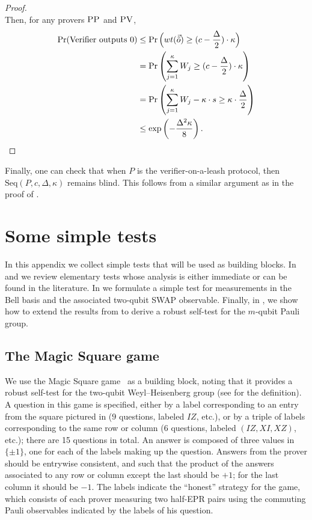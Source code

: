 \documentclass{toc}
\newcommand{\pv}{\textsc{PV}}
\newcommand{\pp}{\textsc{PP}}
\begin{document}
\begin{proof}
\begin{equation*}
\end{equation*}
Then, for any provers $\pp$ and $\pv$,
\begin{align*}
\Pr(\mbox{Verifier outputs $0$}) &\leq \Pr \Big(wt(\vec{\tilde{o}}) \geq (c - \frac{\Delta}{2})\cdot \kappa \Big) \\
&= \Pr \left(\sum_{j=1}^\kappa W_j \geq (c - \frac{\Delta}{2})\cdot \kappa \right) \\
&= \Pr \left(\sum_{j=1}^{\kappa} W_j - \kappa \cdot s \geq \kappa \cdot \frac{\Delta}{2} \right) \\
&\leq \exp \left(-\frac{\Delta^2\kappa}{8}\right). \qedhere
\end{align*}
\end{proof}
 Finally, one can check that when $P$ is the verifier-on-a-leash protocol, then $\mbox{Seq}(P,c,\Delta, \kappa)$ remains blind. This follows from a similar argument as in the proof of .
 
 
 
 
 
\appendix
\appendix




\section{Some simple tests}
\label{sec:clifford-test}


In this appendix we collect simple tests that will be used as building blocks. In  and  we review elementary tests whose analysis is either immediate or can be found in the literature. In  we formulate a simple test for measurements in the Bell basis and the associated two-qubit SWAP observable. 
Finally, in , we show how to extend the results from \cite{natarajan2016robust} to derive a robust self-test for the $m$-qubit Pauli group. 


\subsection{The Magic Square game}
\label{sec:ms}

We use the Magic Square game~\cite{Mermin90} as a building block, noting that it  provides a robust self-test for the two-qubit Weyl--Heisenberg group (see  for the definition). A question in this game is specified, either by a label corresponding to an entry from the square pictured in  ($9$ questions, labeled $IZ$, etc.), or by a triple of labels corresponding to the same row or column ($6$ questions, labeled $(IZ,XI,XZ)$, etc.); there are 15 questions in total. An answer is composed of three values in $\{\pm 1\}$, one for each of the labels making up the question. Answers from the prover should be entrywise consistent, and such that the product of the answers associated to any row or column except the last should be $+1$; for the last column it should be $-1$. The labels indicate the ``honest'' strategy for the game, which consists of each prover measuring two half-EPR pairs using the commuting Pauli observables indicated by the labels of his question. 
\end{document}
